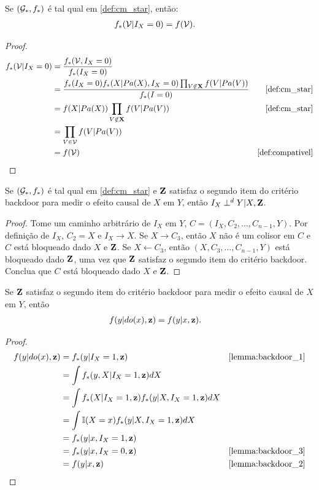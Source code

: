 \begin{lemma}
 \label{lemma:backdoor_2}
 Se $({\mathcal G}_*, f_*)$ é tal qual em \cref{def:cm_star}, então:
 \begin{align*}
  f_*({\mathcal V}|I_X=0) &= f({\mathcal V}).
 \end{align*}
\end{lemma}

\begin{proof}
 \begin{align*}
  f_*(\sV|I_X=0) 
  &= \frac{f_*(\sV, I_X=0)}{f_*(I_X=0)} \\
  &= \frac{f_*(I_X=0)f_*(X|Pa(X),I_{X}=0)
  \prod_{V \notin \X} f(V|Pa(V))}{f_*(I=0)}
  & \text{\cref{def:cm_star}} \\
  &= f(X|Pa(X))\prod_{V \notin \X} f(V|Pa(V))
  & \text{\cref{def:cm_star}} \\
  &= \prod_{V \in \sV} f(V|Pa(V)) \\
  &= f(\sV) 
  & \text{\cref{def:compativel}}
 \end{align*}
\end{proof}

\begin{lemma}
 \label{lemma:backdoor_3}
 Se $({\mathcal G}_*, f_*)$ é tal qual em \cref{def:cm_star} e
 ${\mathbf{Z}}$ satisfaz o segundo item do critério backdoor para
 medir o efeito causal de $X$ em $Y$, então 
 $I_X \perp^d Y | X, {\mathbf{Z}}$.
\end{lemma}

\begin{proof}
 Tome um caminho arbitrário de
 $I_X$ em $Y$, 
 $C = (I_X, C_2, \ldots, C_{n-1}, Y)$.
 Por definição de $I_X$, $C_2 = X$ e 
 $I_X \rightarrow X$. 
 Se $X \rightarrow C_3$, então
 $X$ não é um colisor em $C$ e 
 $C$ está bloqueado dado $X$ e ${\mathbf{Z}}$.
 Se $X \leftarrow C_3$, então
 $(X, C_3, \ldots, C_{n-1}, Y)$ está bloqueado
 dado ${\mathbf{Z}}$, uma vez que ${\mathbf{Z}}$ satisfaz
 o segundo item do critério backdoor.
 Conclua que $C$ está bloqueado dado $X$ e ${\mathbf{Z}}$.
\end{proof}

\begin{lemma}
 \label{thm:backdoor_pt_1}
 Se ${\mathbf{Z}}$ satisfaz 
 o segundo item do critério backdoor para
 medir o efeito causal de $X$ em $Y$, então
 \begin{align*}
  f(y|do(x),{\mathbf{z}}) &= f(y|x,{\mathbf{z}}).
 \end{align*}
\end{lemma}

\begin{proof}
 \begin{align*}
  f(y|do(x),\z)
  &= f_*(y|I_X=1, \z)
  & \text{\cref{lemma:backdoor_1}} \\
  &= \int f_*(y,X|I_X=1, \z)dX \\
  &= \int f_*(X|I_X=1,\z)f_*(y|X, I_X=1, \z)dX \\
  &= \int \I(X=x)f_*(y|X, I_X=1, \z)dX \\
  &= f_*(y|x,I_X=1,\z) \\
  &= f_*(y|x,I_X=0,\z)
  & \text{\cref{lemma:backdoor_3}} \\
  &= f(y|x,\z)
  & \text{\cref{lemma:backdoor_2}}
 \end{align*}
\end{proof}

